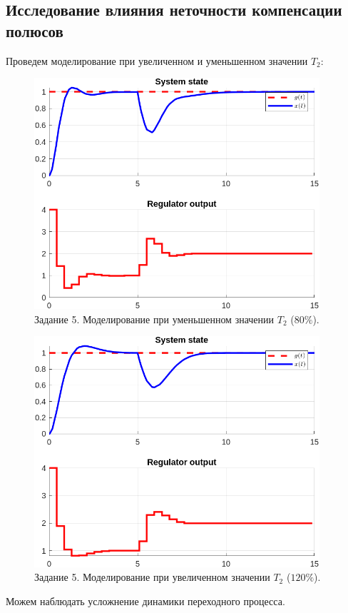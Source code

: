 \documentclass[a4paper, 14pt]{extarticle}
\theoremstyle{definition}
\theoremstyle{plain}
\theoremstyle{remark}
\begin{document}
\subsection{Исследование влияния неточности компенсации полюсов}
Проведем моделирование при увеличенном и уменьшенном значении $T_2$:
\begin{figure}
    [H]
    \centering
    \includegraphics[width=300pt]{images/task5__decreased_state.png}
    \caption{Задание 5. Моделирование при уменьшенном значении $T_2$ ($80\%$).}
    \label{fig:task5__decreased_state}
\end{figure}
\begin{figure}
    [H]
    \centering
    \includegraphics[width=300pt]{images/task5__increased_state.png}
    \caption{Задание 5. Моделирование при увеличенном значении $T_2$ ($120\%$).}
    \label{fig:task5__increased_state}
\end{figure}
Можем наблюдать усложнение динамики переходного процесса.
\end{document}
